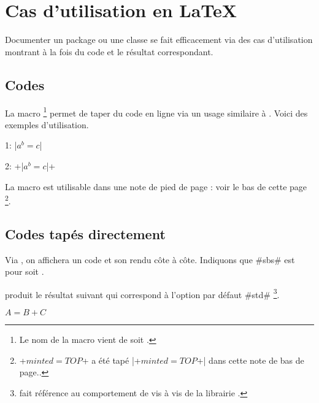 \section{Cas d'utilisation en \LaTeX}

Documenter un package ou une classe se fait efficacement via des cas d'utilisation montrant à la fois du code et le résultat correspondant.




\subsection{Codes } \label{tdoc-listing-inline}

La macro 
\footnote{
    Le nom de la macro  vient de  soit .
}
permet de taper du code en ligne via un usage similaire à .
Voici des exemples d'utilisation.


\begin{tdoclatex}[sbs]
    1: \tdocinlatex|$a^b = c$|

    2: \tdocinlatex+\tdocinlatex|$a^b = c$|+
\end{tdoclatex}


\begin{tdocnote}
    La macro  est utilisable dans une note de pied de page : voir le bas de cette page
    \footnote{
        \tdocinlatex+$minted = TOP$+ a été tapé \tdocinlatex|\tdocinlatex+$minted = TOP$+| dans cette note de bas de page..
    }.
\end{tdocnote}




\subsection{Codes tapés directement}

\begin{tdocexa}
    Via , on affichera un code et son rendu côte à côte.
    Indiquons que \tdocinlatex#sbs# est pour  soit .
\end{tdocexa}




\begin{tdocexa}[À la suite]
     produit le résultat suivant qui correspond à l'option par défaut \tdocinlatex#std#
    \footnote{
         fait référence au comportement  de  vis à vis de la librairie .
    }.

    \begin{tdoclatex}
        $A = B + C$
    \end{tdoclatex}
\end{tdocexa}


